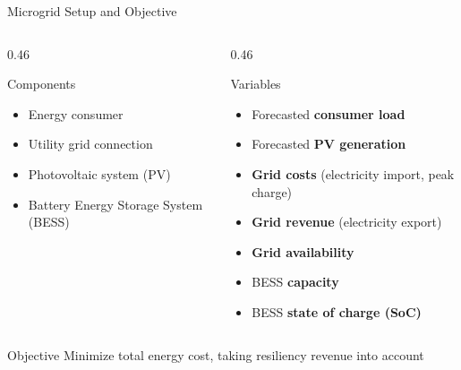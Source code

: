 \documentclass[aspectratio=169]{beamer}
\begin{document}
\begin{frame}{Microgrid Setup and Objective}

\begin{columns}[t]
\begin{column}{0.46\textwidth}

\begin{block}{Components}
\footnotesize
\begin{itemize}
    \item Energy consumer
    \item Utility grid connection
    \item Photovoltaic system (PV)
    \item Battery Energy Storage System (BESS)
\end{itemize}
\end{block}
\end{column}

\hspace{0.04\textwidth}

\begin{column}{0.46\textwidth}
\begin{block}{Variables}
\footnotesize
\begin{itemize}
    \item Forecasted \textbf{consumer load}
    \item Forecasted \textbf{PV generation}
    \item \textbf{Grid costs} (electricity import, peak charge)
    \item \textbf{Grid revenue} (electricity export)
    \item \textbf{Grid availability}
    \item BESS \textbf{capacity}
    \item BESS \textbf{state of charge (SoC)}
\end{itemize}
\end{block}
\end{column}
\end{columns}
\vspace{0.25cm}
\begin{block}{Objective}
\footnotesize
Minimize total energy cost, taking resiliency revenue into account
\end{block}
\end{frame}

\end{document}
